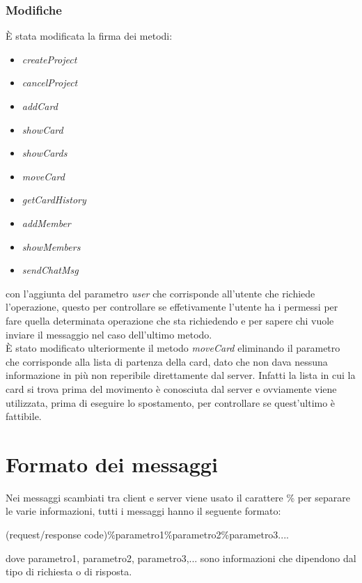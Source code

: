 \documentclass[11pt]{report}
\begin{document}
	\subsection{Modifiche}
	È stata modificata la firma dei metodi:
		\begin{itemize}
			\item \textit{createProject}
			\item \textit{cancelProject}
			\item \textit{addCard}
			\item \textit{showCard}
			\item \textit{showCards}
			\item \textit{moveCard}
			\item \textit{getCardHistory}
			\item \textit{addMember}
			\item \textit{showMembers}
			\item \textit{sendChatMsg}
		\end{itemize}
	con l'aggiunta del parametro \textit{user} che corrisponde all'utente che richiede l'operazione, questo per controllare se effetivamente l'utente ha i permessi per fare quella determinata operazione che sta richiedendo e per sapere chi vuole inviare il messaggio nel caso dell'ultimo metodo.\\
	È stato modificato ulteriormente il metodo \textit{moveCard} eliminando il parametro che corrisponde alla lista di partenza della card, dato che non dava nessuna informazione in più non reperibile direttamente dal server. Infatti la lista in cui la card si trova prima del movimento è conosciuta dal server e ovviamente viene utilizzata, prima di eseguire lo spostamento, per controllare se quest'ultimo è fattibile.
	
	\chapter{Formato dei messaggi}
	Nei messaggi scambiati tra client e server viene usato il carattere \% per separare le varie informazioni, tutti i messaggi hanno il seguente formato:
	\begin{center}
		(request/response code)\%parametro1\%parametro2\%parametro3....
	\end{center}
	dove parametro1, parametro2, parametro3,... sono informazioni che dipendono dal tipo di richiesta o di risposta.
	
\end{document}

